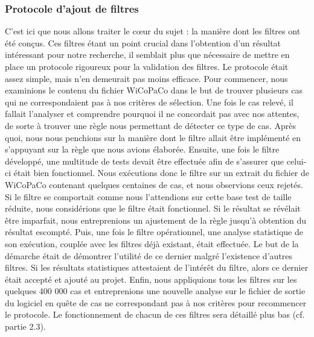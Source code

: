 \documentclass[11pt]{article}
\begin{document}
\subsubsection{Protocole d'ajout de filtres}
C'est ici que nous allons traiter le c{\oe}ur du sujet : la mani\`{e}re dont les filtres ont \'{e}t\'{e} con\c{c}us. Ces filtres \'{e}tant un point crucial dans l'obtention d'un r\'{e}sultat int\'{e}ressant pour notre recherche, il semblait plus que n\'{e}cessaire de mettre en place un protocole rigoureux pour la validation des filtres. Le protocole \'{e}tait assez simple, mais n'en demeurait pas moins efficace.
\newline
\newline
Pour commencer, nous examinions le contenu du fichier WiCoPaCo dans le but de trouver plusieurs cas qui ne correspondaient pas \`{a} nos crit\`{e}res de s\'{e}lection. Une fois le cas relev\'{e}, il fallait l'analyser et comprendre pourquoi il ne concordait pas avec nos attentes, de sorte \`{a} trouver une r\`{e}gle nous permettant de d\'{e}tecter ce type de cas. Apr\`{e}s quoi, nous nous penchions sur la mani\`{e}re dont le filtre allait \^{e}tre impl\'{e}ment\'{e} en s'appuyant sur la r\`{e}gle que nous avions \'{e}labor\'{e}e.
\newline
\newline
Ensuite, une fois le filtre d\'{e}velopp\'{e}, une multitude de tests devait \^{e}tre effectu\'{e}e afin de s'assurer que celui-ci \'{e}tait bien fonctionnel. Nous ex\'{e}cutions donc le filtre sur un extrait du fichier de WiCoPaCo contenant quelques centaines de cas, et nous observions ceux rejet\'{e}s. Si le filtre se comportait comme nous l'attendions sur cette base test de taille r\'{e}duite, nous consid\'{e}rions que le filtre \'{e}tait fonctionnel. Si le r\'{e}sultat se r\'{e}v\'{e}lait \^{e}tre imparfait, nous entreprenions un ajustement de la r\`{e}gle jusqu'\`{a} obtention du r\'{e}sultat escompt\'{e}. 
\newline
\newline
Puis, une fois le filtre op\'{e}rationnel, une analyse statistique de son ex\'{e}cution, coupl\'{e}e avec les filtres d\'{e}j\`{a} existant, \'{e}tait effectu\'{e}e. Le but de la d\'{e}marche \'{e}tait de d\'{e}montrer l'utilit\'{e} de ce dernier malgr\'{e} l'existence d'autres filtres. Si les r\'{e}sultats statistiques attestaient de l'int\'{e}r\^{e}t du filtre, alors ce dernier \'{e}tait accept\'{e} et ajout\'{e} au projet.
\newline
\newline
Enfin, nous appliquions tous les filtres sur les quelques 400 000 cas et entreprenions une nouvelle analyse sur le fichier de sortie du logiciel en qu\^{e}te de cas ne correspondant pas \`{a} nos crit\`{e}res pour recommencer le protocole. Le fonctionnement de chacun de ces filtres sera d\'{e}taill\'{e} plus bas (cf. partie 2.3).
\end{document}
